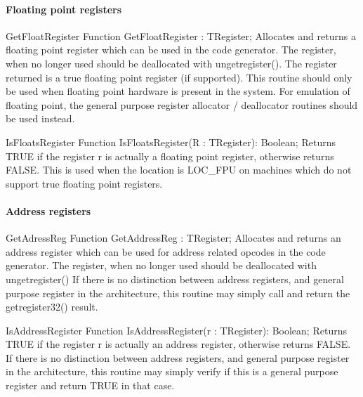 \documentclass [a4paper,12pt]{article}
\begin{document}
\paragraph{Floating point registers}

\begin{function}{GetFloatRegister}
\Declaration
Function GetFloatRegister : TRegister;
\Description
Allocates and returns a floating point register which can be used in the
code generator. The register, when no longer used should be deallocated with
ungetregister(). The register returned is a true floating point register (if
supported).
\Notes
This routine should only be used when floating point hardware is present in
the system. For emulation of floating point, the general purpose register
allocator / deallocator routines should be used instead.
\end{function}

\begin{function}{IsFloatsRegister}
\Declaration
Function IsFloatsRegister(R : TRegister): Boolean;
\Description
Returns TRUE if the register r is actually a floating point register,
otherwise returns FALSE. This is used when the location is LOC{\_}FPU on
machines which do not support true floating point registers.
\end{function}

\paragraph{Address registers}

\begin{function}{GetAdressReg}
\Declaration
Function GetAddressReg : TRegister;
\Description
Allocates and returns an address register which can be used for address
related opcodes in the code generator. The register, when no longer used
should be deallocated with ungetregister()
\Notes
If there is no distinction between address registers, and general purpose
register in the architecture, this routine may simply call and return the
getregister32() result.
\end{function}

\begin{function}{IsAddressRegister}
\Declaration
Function IsAddressRegister(r : TRegister): Boolean;
\Description
Returns TRUE if the register r is actually an address register, otherwise
returns FALSE.
\Notes
If there is no distinction between address registers, and general purpose
register in the architecture, this routine may simply verify if this is a
general purpose register and return TRUE in that case.
\end{function}
\end{document}
